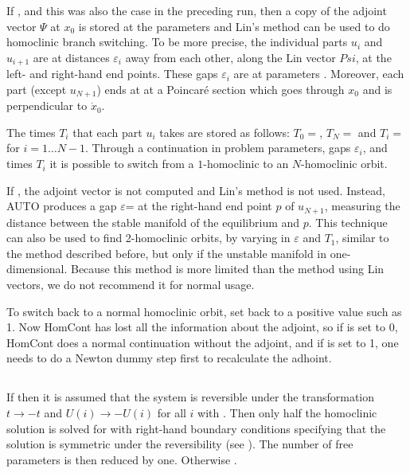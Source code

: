 \documentclass[12pt]{report}
\begin{document}
\begin{itemize}
If , and this was also the case in the preceding run,
then a copy of the adjoint vector $\Psi$ at $x_0$ is stored at the parameters
 and Lin's method can be used
to do homoclinic branch switching. To be more precise, the individual parts
$u_i$ and $u_{i+1}$ are at distances $\varepsilon_i$ away from each
other, along the Lin vector $Psi$, at the left- and right-hand end
points. These gaps $\varepsilon_i$ are at parameters
. Moreover, each part (except $u_{N+1}$) ends at
at a Poincar\'e section which goes through $x_0$ and is perpendicular
to $\dot{x}_0$.

The times $T_i$ that each part $u_i$ takes are stored as follows: 
$T_0=$, $T_N=$ and $T_i=$
for $i=1\ldots N-1$. Through a continuation in problem parameters,
gaps $\varepsilon_i$, and times $T_i$ 
it is possible to switch from a $1$-homoclinic to
an $N$-homoclinic orbit.

If , the adjoint vector is not computed and Lin's
method is not used. Instead, AUTO produces a gap
$\varepsilon$= at the right-hand end point $p$ of
$u_{N+1}$, measuring the distance between the stable manifold of the
equilibrium and $p$. This technique can also be used to find 2-homoclinic
orbits, by varying in $\varepsilon$ and $T_1$, similar to the method
described before, but only if the unstable manifold in
one-dimensional. Because this method is more limited than the method
using Lin vectors, we do not recommend it for normal usage.

To switch back to a normal homoclinic orbit, set  back to
a positive value such as 1. Now HomCont has lost all the information
about the adjoint, so if  is set to 0, HomCont
does a normal continuation without the adjoint, and
if  is set to 1, one needs to do a Newton dummy step
first to recalculate the adhoint.
\end{itemize}

\subsection{}  \label{sec:IREV}
If  then it is assumed that
the system is reversible under the transformation 
$t \to -t$ and $U(i) \to -U(i)$ for all $i$ with 
. Then only half the homoclinic solution is
solved for with right-hand boundary conditions specifying
that the solution is symmetric under the reversibility
(see ). The number of free parameters
is then reduced by one. Otherwise .
\end{document}
